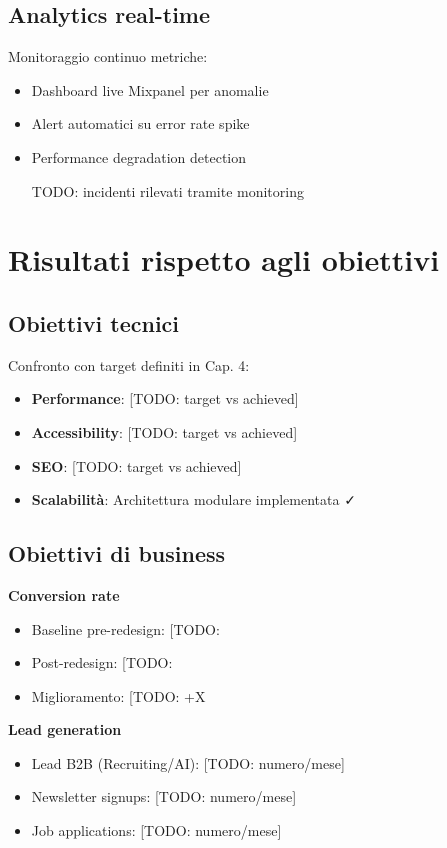 \subsection{Analytics real-time}
Monitoraggio continuo metriche:
\begin{itemize}
  \item Dashboard live Mixpanel per anomalie
  \item Alert automatici su error rate spike
  \item Performance degradation detection
  \item [TODO: incidenti rilevati tramite monitoring]
\end{itemize}

\section{Risultati rispetto agli obiettivi}
\subsection{Obiettivi tecnici}
Confronto con target definiti in Cap. 4:
\begin{itemize}
  \item \textbf{Performance}: [TODO: target vs achieved]
  \item \textbf{Accessibility}: [TODO: target vs achieved]
  \item \textbf{SEO}: [TODO: target vs achieved]
  \item \textbf{Scalabilità}: Architettura modulare implementata ✓
\end{itemize}

\subsection{Obiettivi di business}
\textbf{Conversion rate}
\begin{itemize}
  \item Baseline pre-redesign: [TODO: %
  \item Post-redesign: [TODO: %
  \item Miglioramento: [TODO: +X%
\end{itemize}

\textbf{Lead generation}
\begin{itemize}
  \item Lead B2B (Recruiting/AI): [TODO: numero/mese]
  \item Newsletter signups: [TODO: numero/mese]
  \item Job applications: [TODO: numero/mese]
\end{itemize}

